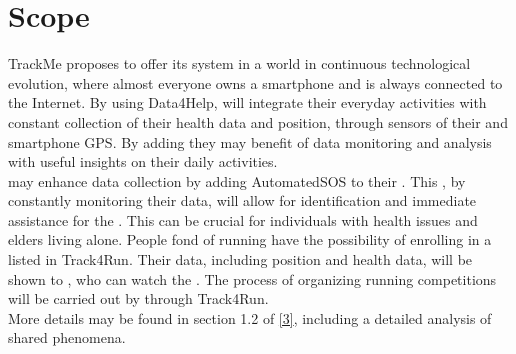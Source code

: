 \documentclass[../../DD.tex]{subfiles}
\begin{document}
\section{Scope}
	TrackMe proposes to offer its system in a world in continuous technological evolution, where almost everyone owns a smartphone and is always connected to the Internet.
	By using Data4Help,  will integrate their everyday activities with constant collection of their health data and position, through sensors of their  and smartphone GPS. By adding  they may benefit of data monitoring and analysis with useful insights on their daily activities. \\

	 may enhance data collection by adding AutomatedSOS to their . This , by constantly monitoring their data, will allow for identification and immediate assistance for the . This can be crucial for individuals with health issues and elders living alone.
	People fond of running have the possibility of enrolling in a  listed in Track4Run. Their data, including position and health data, will be shown to , who can watch the . The process of organizing running competitions will be carried out by  through Track4Run.\\

	More details may be found in section 1.2 of \hyperref[ref:3]{[3]}, including a detailed analysis of shared phenomena.
\end{document}
